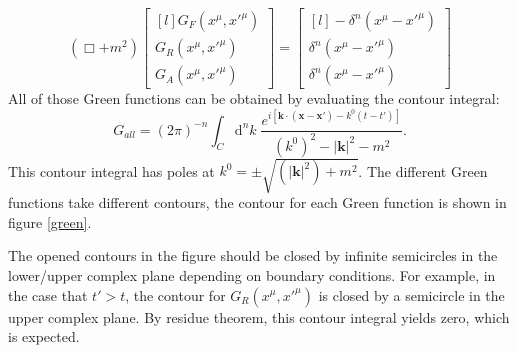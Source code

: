 \documentclass[12pt]{article}
\numberwithin{equation}{subsection}
\theoremstyle{mystyle}{\newtheorem{definition}{Definition}[subsection]}
\theoremstyle{mystyle}{\newtheorem{theorem}[definition]{Theorem}}
\theoremstyle{mystyle}{\newtheorem*{remark}{Remark}}
\theoremstyle{mystyle}{\newtheorem{example}{Example}[subsection]}
\theoremstyle{mystyle}{\newtheorem{examples}{Examples}[subsection]}
\theoremstyle{mystyle}{\newtheorem{cthm}{}[subsection]}
\newcommand{\id}{\mathrm{d}}
\begin{document}
\begin{equation}
  (\Box+m^2)
  \begin{bmatrix*}[l]
    G_{F}(x^{\mu},x'^{\mu})\\
    G_{R}(x^{\mu},x'^{\mu})\\
    G_{A}(x^{\mu},x'^{\mu})
  \end{bmatrix*}
  =
  \begin{bmatrix*}[l]
    -\delta^n(x^{\mu}-x'^{\mu})\\
    \delta^n(x^{\mu}-x'^{\mu})\\
    \delta^n(x^{\mu}-x'^{\mu})
  \end{bmatrix*}
\end{equation}
All of those Green functions can be obtained by evaluating the contour integral:
\begin{equation}
  G_{all}=(2\pi)^{-n}\int_{C}\id^nk\;\frac{e^{i\left[\mathbf{k}\cdot(\mathbf{x}-\mathbf{x'})-k^0(t-t')\right]}}{(k^0)^2-|\mathbf{k}|^2-m^2}.
\end{equation}
This contour integral has poles at \(k^0=\pm \sqrt{(|\mathbf{k}|^2)+m^2}\).
The different Green functions take different contours, the contour for each Green function is shown in figure \ref{green}.

The opened contours in the figure should be closed by infinite semicircles in the lower/upper complex plane depending on boundary conditions.
For example, in the case that \(t'>t\), the contour for \(G_{R}(x^{\mu},x'^{\mu})\) is closed by a semicircle in the upper complex plane.
By residue theorem, this contour integral yields zero, which is expected.
\end{document}
